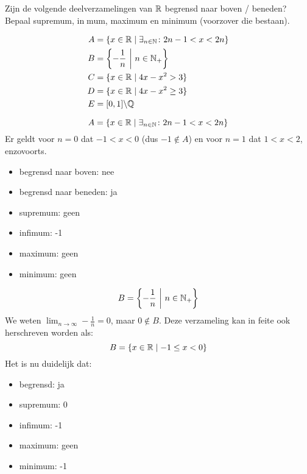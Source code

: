 \documentclass[week=1]{homework}
\date{\today}
\begin{document}
    \maketitle
    \thispagestyle{empty}
    \newpage
    \begin{questions}
		\let\firstquestion\question
		\renewcommand*{\question}{\vspace{7mm}\firstquestion}
        \firstquestion
        
        Zijn de volgende deelverzamelingen van $\mathbb{R}$ begrensd naar boven / beneden?
        Bepaal supremum, inmum, maximum en minimum (voorzover die bestaan).
        
        \begin{align*}
        	A &= \{ x \in \mathbb{R} \mid \exists_{n \in \mathbb{N}} \colon 2n-1 < x < 2n \} \\
        	B &= \left\{ - \frac{1}{n} \ \middle| \ n \in \mathbb{N}_+ \right\} \\
        	C &= \{ x \in \mathbb{R} \mid 4x - x^2 > 3 \} \\
        	D &= \{ x \in \mathbb{R} \mid 4x - x^2 \geq 3 \} \\
        	E &= [0,1]\backslash \mathbb{Q}
        \end{align*}
        
        \[
	        A = \{ x \in \mathbb{R} \mid \exists_{n \in \mathbb{N}} \colon 2n-1 < x < 2n \}
        \]
		Er geldt voor $n=0$ dat $-1 < x < 0$ (dus $-1 \not \in A$) en voor $n=1$ dat $1 < x < 2$, enzovoorts.
		      \begin{itemize}
		      	\item begrensd naar boven: nee
		      	\item begrensd naar beneden: ja 
		      	\item supremum: geen
		      	\item infimum: -1
		      	\item maximum: geen
		      	\item minimum: geen
		      \end{itemize}
		              
        \[
	        B = \left\{ - \frac{1}{n} \ \middle| \ n \in \mathbb{N}_+ \right\}
        \]
        We weten $\lim_{n \to \infty} -\frac{1}{n} = 0$, maar $0 \not \in B$. Deze verzameling kan in feite ook herschreven worden als:
        \[
	        B = \{x \in \mathbb{R} \mid -1 \le x < 0 \}
        \]
        Het is nu duidelijk dat:
              \begin{itemize}
              	\item begrensd: ja
              	\item supremum: 0
              	\item infimum: -1
              	\item maximum: geen
              	\item minimum: -1
              \end{itemize}
              

\end{questions}
\end{document}
